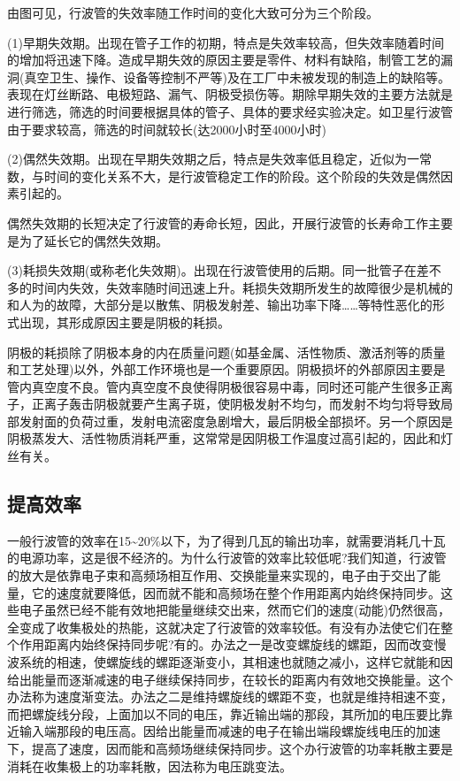 由图可见，行波管的失效率随工作时间的变化大致可分为三个阶段。

(1)早期失效期。出现在管子工作的初期，特点是失效率较高，但失效率随着时间的增加将迅速下降。造成早期失效的原因主要是零件、材料有缺陷，制管工艺的漏洞(真空卫生、操作、设备等控制不严等)及在工厂中未被发现的制造上的缺陷等。表现在灯丝断路、电极短路、漏气、阴极受损伤等。期除早期失效的主要方法就是进行筛选，筛选的时间要根据具体的管子、具体的要求经实验决定。如卫星行波管由于要求较高，筛选的时间就较长(达2000小时至4000小时)

(2)偶然失效期。出现在早期失效期之后，特点是失效率低且稳定，近似为一常数，与时间的变化关系不大，是行波管稳定工作的阶段。这个阶段的失效是偶然因素引起的。

偶然失效期的长短决定了行波管的寿命长短，因此，开展行波管的长寿命工作主要是为了延长它的偶然失效期。

(3)耗损失效期(或称老化失效期)。出现在行波管使用的后期。同一批管子在差不多的时间内失效，失效率随时间迅速上升。耗损失效期所发生的故障很少是机械的和人为的故障，大部分是以散焦、阴极发射差、输出功率下降……等特性恶化的形式出现，其形成原因主要是阴极的耗损。

阴极的耗损除了阴极本身的内在质量问题(如基金属、活性物质、激活剂等的质量和工艺处理)以外，外部工作环境也是一个重要原因。阴极损坏的外部原因主要是管内真空度不良。管内真空度不良使得阴极很容易中毒，同时还可能产生很多正离子，正离子轰击阴极就要产生离子斑，使阴极发射不均匀，而发射不均匀将导致局部发射面的负荷过重，发射电流密度急剧增大，最后阴极全部损坏。另一个原因是阴极蒸发大、活性物质消耗严重，这常常是因阴极工作温度过高引起的，因此和灯丝有关。
\subsection{提高效率}
一般行波管的效率在15\textasciitilde20\%以下，为了得到几瓦的输出功率，就需要消耗几十瓦的电源功率，这是很不经济的。为什么行波管的效率比较低呢?我们知道，行波管的放大是依靠电子束和高频场相互作用、交换能量来实现的，电子由于交出了能量，它的速度就要降低，因而就不能和高频场在整个作用距离内始终保持同步。这些电子虽然已经不能有效地把能量继续交出来，然而它们的速度(动能)仍然很高，全变成了收集极处的热能，这就决定了行波管的效率较低。有没有办法使它们在整个作用距离内始终保持同步呢?有的。办法之一是改变螺旋线的螺距，因而改变慢波系统的相速，使螺旋线的螺距逐渐变小，其相速也就随之减小，这样它就能和因给出能量而逐渐减速的电子继续保持同步，在较长的距离内有效地交换能量。这个办法称为速度渐变法。办法之二是维持螺旋线的螺距不变，也就是维持相速不变，而把螺旋线分段，上面加以不同的电压，靠近输出端的那段，其所加的电压要比靠近输入端那段的电压高。因给出能量而减速的电子在输出端段螺旋线电压的加速下，提高了速度，因而能和高频场继续保持同步。这个办行波管的功率耗散主要是消耗在收集极上的功率耗散，因法称为电压跳变法。

